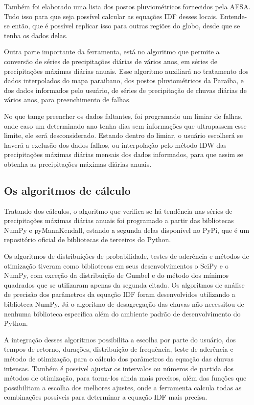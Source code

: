 Também foi elaborado uma lista dos postos pluviométricos fornecidos pela AESA. Tudo isso para que seja possível calcular as equações IDF desses locais. Entende-se então, que é possível replicar isso para outras regiões do globo, desde que se tenha os dados delas. 

Outra parte importante da ferramenta, está no algoritmo que permite a conversão de séries de precipitações diárias de vários anos, em séries de precipitações máximas diárias anuais. Esse algoritmo auxiliará no tratamento dos dados interpolados do mapa paraibano, dos postos pluviométricos da Paraíba, e dos dados informados pelo usuário, de séries de precipitação de chuvas diárias de vários anos, para preenchimento de falhas.

No que tange preencher os dados faltantes, foi programado um limiar de falhas, onde caso um determinado ano tenha dias sem informações que ultrapassem esse limite, ele será desconsiderado. Estando dentro do limiar, o usuário escolherá se haverá a exclusão dos dados falhos, ou interpolação pelo método IDW das precipitações máximas diárias mensais dos dados informados, para que assim se obtenha as precipitações máximas diárias anuais.

\subsection{Os algoritmos de cálculo}

Tratando dos cálculos, o algoritmo que verifica se há tendência nas séries de precipitações máximas diárias anuais foi programado a partir das bibliotecas NumPy e pyMannKendall, estando a segunda delas disponível no PyPi, que é um repositório oficial de bibliotecas de terceiros do Python. 

Os algoritmos de distribuições de probabilidade, testes de aderência e métodos de otimização tiveram como bibliotecas em seus desenvolvimentos o SciPy e o NumPy, com exceção da distribuição de Gumbel e do método dos mínimos quadrados que se utilizaram apenas da segunda citada. Os algoritmos de análise de precisão dos parâmetros da equação IDF foram desenvolvidos utilizando a biblioteca NumPy. Já o algoritmo de desagregação das chuvas não necessitou de nenhuma biblioteca específica além do ambiente padrão de desenvolvimento do Python.

A integração desses algoritmos possibilita a escolha por parte do usuário, dos tempos de retorno, durações, distribuição de frequência, teste de aderência e método de otimização, para o cálculo dos parâmetros da equação das chuvas intensas. Também é possível ajustar os intervalos ou números de partida dos métodos de otimização, para torna-los ainda mais precisos, além das funções que possibilitam a escolha dos melhores ajustes, onde a ferramenta calcula todas as combinações possíveis para determinar a equação IDF mais precisa.


